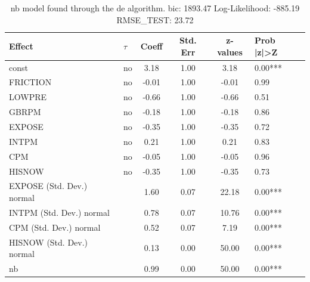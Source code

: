 \begin{table}
	\caption{nb model found through the de algorithm. bic: 1893.47 Log-Likelihood: -885.19 RMSE_TEST: 23.72}
	\begin{center}
		\begin{tabular}{|l|l|c|c|c|l|}
			\hline
			Effect & $\tau$ & Coeff & Std. Err & z-values & Prob |z|>Z \\
			\hline
			const & no & 3.18 & 1.00 & 3.18 & 0.00*** \\
			\hline
			FRICTION & no & -0.01 & 1.00 & -0.01 & 0.99 \\
			\hline
			LOWPRE & no & -0.66 & 1.00 & -0.66 & 0.51 \\
			\hline
			GBRPM & no & -0.18 & 1.00 & -0.18 & 0.86 \\
			\hline
			EXPOSE & no & -0.35 & 1.00 & -0.35 & 0.72 \\
			\hline
			INTPM & no & 0.21 & 1.00 & 0.21 & 0.83 \\
			\hline
			CPM & no & -0.05 & 1.00 & -0.05 & 0.96 \\
			\hline
			HISNOW & no & -0.35 & 1.00 & -0.35 & 0.73 \\
			\hline
			EXPOSE (Std. Dev.) normal &  & 1.60 & 0.07 & 22.18 & 0.00*** \\
			\hline
			INTPM (Std. Dev.) normal &  & 0.78 & 0.07 & 10.76 & 0.00*** \\
			\hline
			CPM (Std. Dev.) normal &  & 0.52 & 0.07 & 7.19 & 0.00*** \\
			\hline
			HISNOW (Std. Dev.) normal &  & 0.13 & 0.00 & 50.00 & 0.00*** \\
			\hline
			nb &  & 0.99 & 0.00 & 50.00 & 0.00*** \\
			\hline
		\end{tabular}
	\end{center}
\end{table}